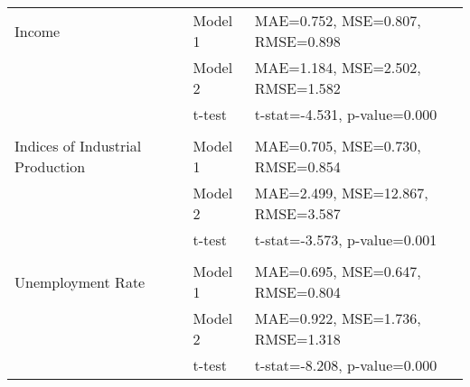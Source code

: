 \documentclass[a4paper,12pt]{article}
\begin{document}
\begin{table}
\begin{tabular}{llp{10cm}}
Income & Model 1 & MAE=0.752, MSE=0.807, RMSE=0.898 \\
 & Model 2 & MAE=1.184, MSE=2.502, RMSE=1.582 \\
 & t-test & t-stat=-4.531, p-value=0.000 \\
\arrayrulecolor{black!30}\midrule &  &  \\
Indices of Industrial Production & Model 1 & MAE=0.705, MSE=0.730, RMSE=0.854 \\
 & Model 2 & MAE=2.499, MSE=12.867, RMSE=3.587 \\
 & t-test & t-stat=-3.573, p-value=0.001 \\
\arrayrulecolor{black!30}\midrule &  &  \\
Unemployment Rate & Model 1 & MAE=0.695, MSE=0.647, RMSE=0.804 \\
 & Model 2 & MAE=0.922, MSE=1.736, RMSE=1.318 \\
 & t-test & t-stat=-8.208, p-value=0.000 \\
\bottomrule
\end{tabular}
\end{table}
\end{document}
